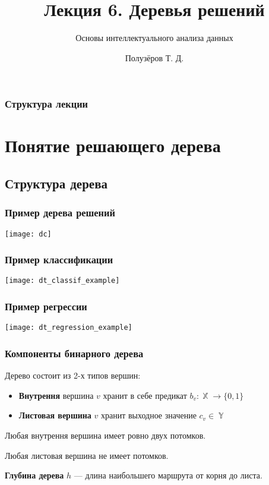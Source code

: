 \documentclass{beamer}
\title[Деревья решений]{Лекция 6. Деревья решений}
\subtitle{Основы интеллектуального анализа данных}
\author{Полузёров Т. Д.}
\institute{БГУ ФПМИ}
\date{}
\DeclareMathOperator{\X}{\mathbb{X}}
\DeclareMathOperator{\Y}{\mathbb{Y}}
\begin{document}
	
	\begin{frame}
		\titlepage
	\end{frame}
	
	
	\begin{center}
		\frametitle{Структура лекции}
		\tableofcontents	
	\end{center}
    
	\section{Понятие решающего дерева}

	\subsection{Структура дерева}

	\begin{frame}
		\frametitle{Пример дерева решений}
		\texttt{[image: dc]}
	\end{frame}

	\begin{frame}
		\frametitle{Пример классификации}

		\texttt{[image: dt\_classif\_example]}
	\end{frame}

	\begin{frame}
		\frametitle{Пример регрессии}

		\texttt{[image: dt\_regression\_example]}
	\end{frame}

    \begin{frame}
        \frametitle{Компоненты бинарного дерева}

		Дерево состоит из 2-х типов вершин:
		\begin{itemize}
			\item \textbf{Внутрення} вершина $v$ хранит в себе предикат $b_v: \X \rightarrow \{0, 1\}$
			\item \textbf{Листовая вершина} $v$ хранит выходное значение $c_v \in \Y$
		\end{itemize}

		\vspace{15pt}

		Любая внутрення вершина имеет ровно двух потомков.

		Любая листовая вершина не имеет потомков.

		\vspace{15pt}

		\textbf{Глубина дерева} $h$ --- длина наибольшего маршрута от корня до листа.
    \end{frame}
	
\end{document}
